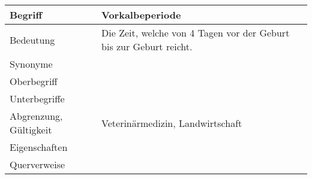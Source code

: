 \begin{table}[h]
	\centering	
	\begin{tabular}{ p{4.5cm} p{10.5cm} } 
		\toprule[1pt]
		\rowcolor{maroon!30}

		\textbf{Begriff} &  \textbf{Vorkalbeperiode} \\		
		\midrule
	
		Bedeutung  & Die Zeit, welche von 4 Tagen vor der Geburt bis zur Geburt reicht.\\		
		Synonyme  &\\				
		Oberbegriff  &  \\		
		Unterbegriffe   & \\		
		Abgrenzung, Gültigkeit  & Veterinärmedizin, Landwirtschaft\\			
		Eigenschaften  & \\				
		Querverweise  & \\	
		\bottomrule				
		
	\end{tabular}
	\label{tab: Glossareintrag zu Vorkalbeperiode}
	\caption{}
\end{table}


